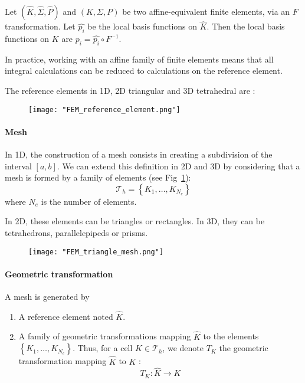 	\begin{Rem}
		Let $(\hat{K},\hat{\Sigma},\hat{P})$ and $(K,\Sigma,P)$ be two affine-equivalent finite elements, via an $F$ transformation. Let $\hat{p_i}$ be the local basis functions on $\hat{K}$. Then the local basis functions on $K$ are $p_i=\hat{p_i}\circ F^{-1}$.
	\end{Rem}
		
	\begin{Rem}
		In practice, working with an affine family of finite elements means that all integral calculations can be reduced to calculations on the reference element. 
		
		The reference elements in 1D, 2D triangular and 3D tetrahedral are :
		\begin{figure}[H]
			\centering
			\texttt{[image: "FEM\_reference\_element.png"]}
		\end{figure}
	\end{Rem}

\paragraph{Mesh}

In 1D, the construction of a mesh consists in creating a subdivision of the interval $[a,b]$. We can extend this definition in 2D and 3D by considering that a mesh is formed by a family of elements (see Fig~\ref{triangle_mesh}):
\begin{equation*}
	\mathcal{T}_h = \left\{K_1,\dots,K_{N_e}\right\}
\end{equation*} 
where $N_e$ is the number of elements. 

In 2D, these elements can be triangles or rectangles. In 3D, they can be tetrahedrons, parallelepipeds or prisms.

\begin{figure}[H]
	\centering
	\texttt{[image: "FEM\_triangle\_mesh.png"]}
	\label{triangle_mesh}
\end{figure}

\paragraph{Geometric transformation}

A mesh is generated by
\begin{enumerate}[label=\textbullet]
	\item A reference element noted $\hat{K}$.
	\item A family of geometric transformations mapping $\hat{K}$ to the elements $\left\{K_1,\dots,K_{N_e}\right\}$. Thus, for a cell $K\in\mathcal{T}_h$, we denote $T_K$ the geometric transformation mapping $\hat{K}$ to $K$ :
	\begin{equation*}
	T_K : \hat{K}\rightarrow K
	\end{equation*}
\end{enumerate}


